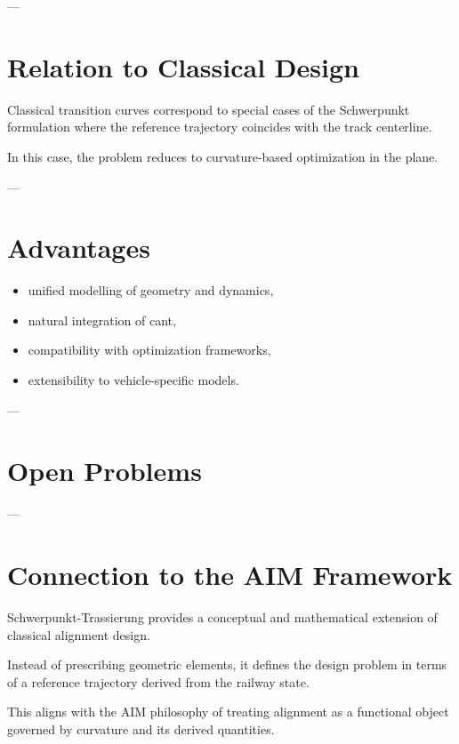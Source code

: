 ---

\section{Relation to Classical Design}

\begin{proposition}
Classical transition curves correspond to special cases of the
Schwerpunkt formulation where the reference trajectory coincides with
the track centerline.
\end{proposition}

\begin{remark}
In this case, the problem reduces to curvature-based optimization in
the plane.
\end{remark}

---

\section{Advantages}

\begin{itemize}
\item unified modelling of geometry and dynamics,
\item natural integration of cant,
\item compatibility with optimization frameworks,
\item extensibility to vehicle-specific models.
\end{itemize}

---

\section{Open Problems}




---

\section{Connection to the AIM Framework}

\begin{summary}
Schwerpunkt-Trassierung provides a conceptual and mathematical extension
of classical alignment design.

Instead of prescribing geometric elements, it defines the design
problem in terms of a reference trajectory derived from the railway
state.

This aligns with the AIM philosophy of treating alignment as a
functional object governed by curvature and its derived quantities.
\end{summary}

